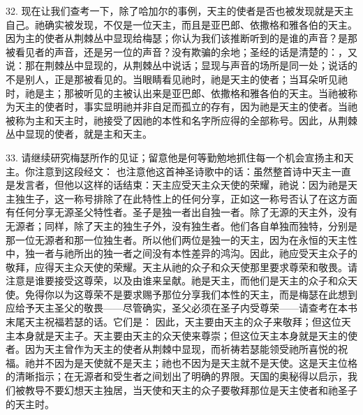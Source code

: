 32. 现在让我们查考一下，除了哈加尔的事例，天主的使者是否也被发现就是天主自己。祂确实被发现，不仅是一位天主，而且是亚巴郎、依撒格和雅各伯的天主。因为主的使者从荆棘丛中显现给梅瑟；你认为我们该推断听到的是谁的声音？是那被看见者的声音，还是另一位的声音？没有欺骗的余地；圣经的话是清楚的：，又说：那在荆棘丛中显现的，从荆棘丛中说话；显现与声音的场所是同一处；说话的不是别人，正是那被看见的。当眼睛看见祂时，祂是天主的使者；当耳朵听见祂时，祂是主；那被听见的主被认出来是亚巴郎、依撒格和雅各伯的天主。当祂被称为天主的使者时，事实显明祂并非自足而孤立的存有，因为祂是天主的使者。当祂被称为主和天主时，祂接受了因祂的本性和名字所应得的全部称号。因此，从荆棘丛中显现的使者，就是主和天主。\par

33. 请继续研究梅瑟所作的见证；留意他是何等勤勉地抓住每一个机会宣扬主和天主。你注意到这段经文： 也注意他这首神圣诗歌中的话：虽然整首诗中天主一直是发言者，但他以这样的话结束：天主应受天主众天使的荣耀，祂说：因为祂是天主独生子，这一称号排除了在此特性上的任何分享，正如这一称号否认了在这方面有任何分享无源圣父特性者。圣子是独一者出自独一者。除了无源的天主外，没有无源者；同样，除了天主的独生子外，没有独生者。他们各自单独而独特，分别是那一位无源者和那一位独生者。所以他们两位是独一的天主，因为在永恒的天主性中，独一者与祂所出的独一者之间没有本性差异的鸿沟。因此，祂应受天主众子的敬拜，应得天主众天使的荣耀。天主从祂的众子和众天使那里要求尊荣和敬畏。请注意是谁要接受这尊荣，以及由谁来呈献。祂是天主，而他们是天主的众子和众天使。免得你以为这尊荣不是要求赐予那位分享我们本性的天主，而是梅瑟在此想到应给予天主圣父的敬畏——尽管确实，圣父必须在圣子内受尊荣——请查考在本书末尾天主祝福若瑟的话。它们是： 因此，天主要由天主的众子来敬拜；但这位天主本身就是天主子。天主要由天主的众天使来尊崇；但这位天主本身就是天主的使者。因为天主曾作为天主的使者从荆棘中显现，而祈祷若瑟能领受祂所喜悦的祝福。祂并不因为是天使就不是天主；祂也不因为是天主就不是天使。这是天主位格的清晰指示；在无源者和受生者之间划出了明确的界限。天国的奥秘得以启示，我们被教导不要幻想天主独居，当天使和天主的众子要敬拜那位是天主使者和祂圣子的天主时。\par

